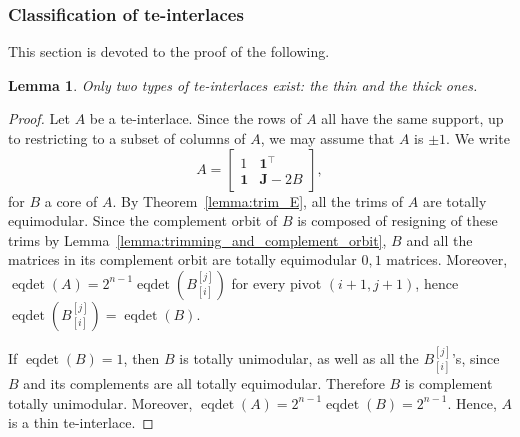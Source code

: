\documentclass[11pt,a4paper]{amsart}
\theoremstyle{plain}
\newtheorem{lemma}[theorem]{Lemma}
\theoremstyle{definition}
\DeclareMathOperator{\eqdet}{eqdet}
\begin{document}
\subsubsection{Classification of te-interlaces}
This section is devoted to the proof of the following.
\begin{lemma}\label{lemma:two_types_te-interlaces}
Only two types of te-interlaces exist: the thin and the thick ones.
\end{lemma}
\begin{proof}
Let $A$ be a te-interlace.
Since the rows of $A$ all have the same support, up to restricting to a subset of columns of $A$, we may assume that $A$ is $\pm 1$.
We write
$$A=\begin{bmatrix}
1 & \mathbf{1}^\top \\
\mathbf{1} & \mathbf{J}- 2B
\end{bmatrix},$$
for $B$ a core of $A$.
By Theorem~\ref{lemma:trim_E}, all the trims of $A$ are totally equimodular. Since the complement orbit of $B$ is composed of resigning of these trims by Lemma~\ref{lemma:trimming_and_complement_orbit}, $B$ and all the matrices in its complement orbit are totally equimodular $0,\!1$ matrices.
Moreover, $\eqdet (A) = 2^{n-1}\eqdet(B_{[i]}^{[j]})$ for every pivot $(i+1,j+1)$, hence $\eqdet(B_{[i]}^{[j]})=\eqdet(B)$.
\medskip

If $\eqdet(B)=1$, then $B$ is totally unimodular, as well as all the $B_{[i]}^{[j]}$'s, since $B$ and its complements are all totally equimodular. 
Therefore $B$ is complement totally unimodular.
Moreover, $\eqdet (A)=  2^{n-1}\eqdet(B) = 2^{n-1}$.
Hence, $A$ is a thin te-interlace.
\medskip


\end{proof}
\end{document}
